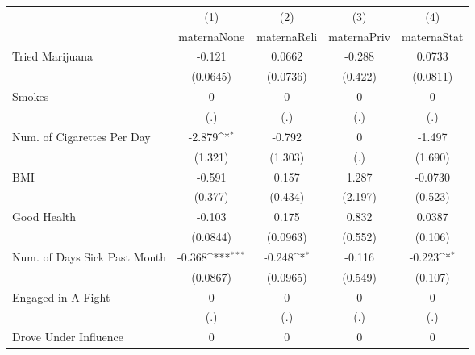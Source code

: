 {
\def\sym#1{\ifmmode^{#1}\else\(^{#1}\)\fi}
\begin{tabular}{l*{4}{c}}
\hline\hline
            &\multicolumn{1}{c}{(1)}&\multicolumn{1}{c}{(2)}&\multicolumn{1}{c}{(3)}&\multicolumn{1}{c}{(4)}\\
            &\multicolumn{1}{c}{maternaNone}&\multicolumn{1}{c}{maternaReli}&\multicolumn{1}{c}{maternaPriv}&\multicolumn{1}{c}{maternaStat}\\
\hline
Tried Marijuana&      -0.121         &      0.0662         &      -0.288         &      0.0733         \\
            &    (0.0645)         &    (0.0736)         &     (0.422)         &    (0.0811)         \\
[1em]
Smokes      &           0         &           0         &           0         &           0         \\
            &         (.)         &         (.)         &         (.)         &         (.)         \\
[1em]
Num. of Cigarettes Per Day&      -2.879\sym{*}  &      -0.792         &           0         &      -1.497         \\
            &     (1.321)         &     (1.303)         &         (.)         &     (1.690)         \\
[1em]
BMI         &      -0.591         &       0.157         &       1.287         &     -0.0730         \\
            &     (0.377)         &     (0.434)         &     (2.197)         &     (0.523)         \\
[1em]
Good Health &      -0.103         &       0.175         &       0.832         &      0.0387         \\
            &    (0.0844)         &    (0.0963)         &     (0.552)         &     (0.106)         \\
[1em]
Num. of Days Sick Past Month&      -0.368\sym{***}&      -0.248\sym{*}  &      -0.116         &      -0.223\sym{*}  \\
            &    (0.0867)         &    (0.0965)         &     (0.549)         &     (0.107)         \\
[1em]
Engaged in A Fight&           0         &           0         &           0         &           0         \\
            &         (.)         &         (.)         &         (.)         &         (.)         \\
[1em]
Drove Under Influence&           0         &           0         &           0         &           0         \\

\end{tabular}}
